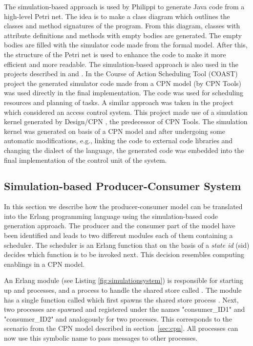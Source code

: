 The simulation-based approach is used by Philippi \cite{RefWorks:4} to generate Java code from a high-level Petri net. The idea is to make a class diagram which outlines the classes and method signatures of the program. From this diagram, classes with attribute definitions and methods with empty bodies are generated. The empty bodies are filled with the simulator code made from the formal model. After this, the structure of the Petri net is used to enhance the code to make it more efficient and more readable. The simulation-based approach is also used in the projects described in \cite{RefWorks:78} and \cite{RefWorks:2}. In the Course of Action Scheduling Tool (COAST) project \cite{RefWorks:2} the generated simulator code made from a CPN model (by CPN Tools) was used directly in the final implementation. The code was used for scheduling resources and planning of tasks. A similar approach was taken in the project \cite{RefWorks:78} which considered an access control system. This project made use of a simulation kernel generated by Design/CPN \cite{DESIGNCPN}, the predecessor of CPN Tools. The simulation kernel was generated on basis of a CPN model and after undergoing some automatic modifications, e.g., linking the code to external code libraries and changing the dialect of the language, the generated code was embedded into the final implementation of the control unit of the system.

\subsection{Simulation-based Producer-Consumer System}
In this section we describe how the producer-consumer model can be translated into the Erlang programming language using the simulation-based code generation approach. The producer and the consumer part of the model have been identified and leads to two different modules each of them containing a scheduler. The scheduler is an Erlang function that on the basis of a \emph{state id} (sid) decides which function is to be invoked next. This decision resembles computing enablings in a CPN model.

An Erlang module  (see Listing \ref{fig:simulationsystem}) is responsible for starting up  and  processes, and a process to handle the shared store called . The  module has a single function called  which first spawns the shared store process . Next, two  processes are spawned and registered under the names "consumer\_ID1" and "consumer\_ID2" and analogously for two  processes. This corresponds to the scenario from the CPN model described in section~\ref{sec:cpn}. All processes can now use this symbolic name to pass messages to other processes.

